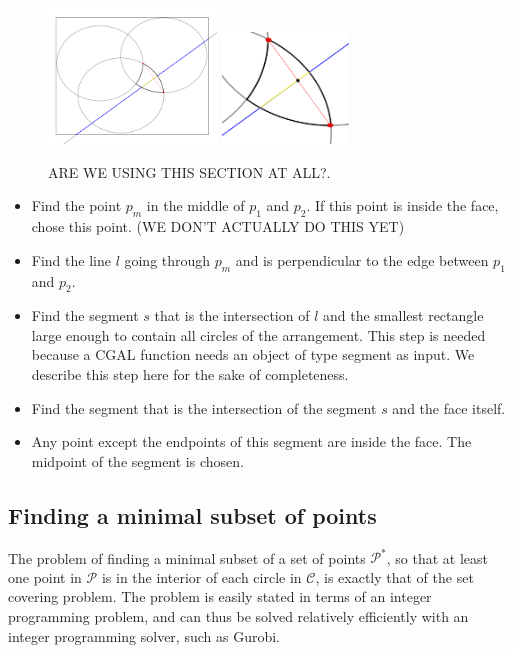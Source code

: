 \documentclass[a4paper,12pt]{article}
\begin{document}
\begin{figure}[hb]
\includegraphics[width=0.4\textwidth]{pictures/PointInFace.png}
\includegraphics[width=0.3\textwidth]{pictures/PointInFace2.png}
 \caption[Close up of \textit{Hemidactylus} sp.]
   {ARE WE USING THIS SECTION AT ALL?.}
\end{figure}
\begin {itemize}
\item
Find the point $p_m$ in the middle of $p_1$ and $p_2$. If this point is inside the face, chose this point. (WE DON'T ACTUALLY DO THIS YET)
\item
Find the line $l$ going through $p_m$ and is perpendicular to the edge between $p_1$ and $p_2$.
\item
Find the segment $s$ that is the intersection of $l$ and the smallest rectangle large enough to contain all circles of the arrangement. This step is needed because a CGAL function needs an object of type segment as input. We describe this step here for the sake of completeness.
\item
Find the segment that is the intersection of the segment $s$ and the face itself.
\item
Any point except the endpoints of this segment are inside the face. The midpoint of the segment is chosen.
\end{itemize}

\subsection{Finding a minimal subset of points}
\label{sec:gurobi}
The problem of finding a minimal subset of a set of points $\mathcal P^*$, so that at least one point in $\mathcal P$ is in the interior of each circle in $\mathcal C$, is exactly that of the set covering problem. The problem is easily stated in terms of an integer programming problem, and can thus be solved relatively efficiently with an integer programming solver, such as Gurobi.
\end{document}
